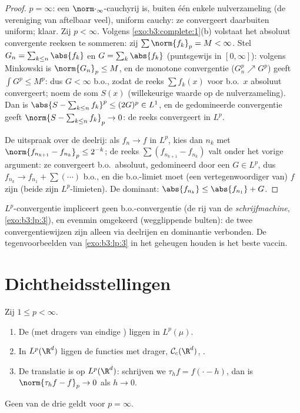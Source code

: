 \begin{proof}
$p = \infty$: een $\norm\cdot_\infty$-cauchyrij is, buiten één
enkele nulverzameling (de vereniging van aftelbaar veel),
uniform cauchy: ze convergeert daarbuiten uniform; klaar. Zij $p
< \infty$. Volgens \cref{exo:b3:complete:1}(b) volstaat het
absoluut convergente reeksen te sommeren: zij
$\sum\norm{f_k}_p = M < \infty$. Stel $G_n = \sum_{k \leq
n}\abs{f_k}$ en $G = \sum_k\abs{f_k}$ (puntsgewijs in
$[0,\infty]$): volgens Minkowski is $\norm{G_n}_p \leq M$, en de
monotone convergentie ($G_n^p \nearrow G^p$) geeft $\int G^p
\leq M^p$: dus $G < \infty$ b.o., zodat de reeks $\sum f_k(x)$
voor b.o.\ $x$ absoluut convergeert; noem de som $S(x)$
(willekeurige waarde op de nulverzameling). Dan is $\abs{S -
\sum_{k\leq n}f_k}^p \leq (2G)^p \in L^1$, en de gedomineerde
convergentie geeft $\norm{S - \sum_{k\leq n}f_k}_p \to 0$: de
reeks convergeert in $L^p$.

De uitspraak over de deelrij: als $f_n \to f$ in $L^p$, kies dan
$n_k$ met $\norm{f_{n_{k+1}} - f_{n_k}}_p \leq 2^{-k}$; de reeks
$\sum(f_{n_{k+1}} - f_{n_k})$ valt onder het vorige argument: ze
convergeert b.o.\ absoluut, gedomineerd door een $G \in L^p$,
dus $f_{n_k} \to f_{n_1} + \sum(\cdots)$ b.o., en die b.o.-limiet
moet (een vertegenwoordiger van) $f$ zijn (beide zijn
$L^p$-limieten). De dominant: $\abs{f_{n_k}} \leq \abs{f_{n_1}} +
G$.
\end{proof}

\begin{remark}\label{rem:b3:lp:modes}
$L^p$-convergentie impliceert geen b.o.-convergentie (de rij van
de \emph{schrijfmachine}, \cref{exo:b3:lp:3}), en evenmin
omgekeerd (wegglippende bulten): de twee convergentiewijzen zijn
alleen via deelrijen en dominantie verbonden. De tegenvoorbeelden
van \cref{exo:b3:lp:3} in het geheugen houden is het beste
vaccin.
\end{remark}

\section{Dichtheidsstellingen}

\begin{theorem}\label{thm:b3:lp:density}
Zij $1 \leq p < \infty$.
\begin{enumerate}
  \item De  (met dragers van eindige )
        liggen  in $L^p(\mu)$.
  \item In $L^p(\R^d)$ liggen de  functies met 
        drager, $\mathcal C_c(\R^d)$, .
  \item De translatie is  op $L^p(\R^d)$: schrijven we
        $\tau_hf = f(\cdot - h)$, dan is $\norm{\tau_hf - f}_p
        \to 0$ als $h \to 0$.
\end{enumerate}
Geen van de drie geldt voor $p = \infty$.
\end{theorem}

